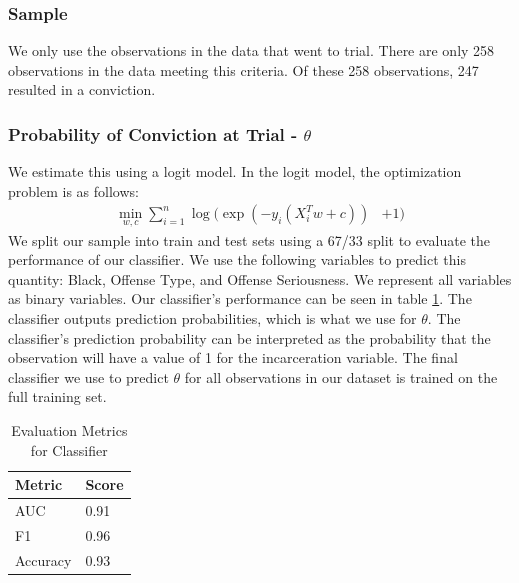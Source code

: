 \documentclass[11pt, oneside]{article}   	%
\theoremstyle{ModifiedStyle}
\begin{document}
		\subsubsection{Sample}
			We only use the observations in the data that went to trial. There are only 258 observations in the data meeting this criteria. Of these 258 observations, 247 resulted in a conviction.

	  \subsubsection{Probability of Conviction at Trial - $\theta$}
	    \label{theta-estimation}
	    We estimate this using a logit model. In the logit model, the optimization problem is as follows:
			\begin{align*}
				\min_{w,c} \sum_{i=1}^n \log(\exp(-y_i(X_i^Tw+c)) &+ 1)
			\end{align*}
			We split our sample into train and test sets using a 67/33 split to evaluate the performance of our classifier. We use the following variables to predict this quantity: Black, Offense Type, and Offense Seriousness. We represent all variables as binary variables.  Our classifier's performance can be seen in table \ref{classifier-performance}. The classifier outputs prediction probabilities, which is what we use for $\theta$. The classifier's prediction probability can be interpreted as the probability that the observation will have a value of 1 for the incarceration variable. The final classifier we use to predict $\theta$ for all observations in our dataset is trained on the full training set.

	    \begin{table}[H]
	      \centering
	      \caption{Evaluation Metrics for Classifier}
	      \label{classifier-performance}
	      \begin{tabular}{|l|l|}
	      \hline
	      \textbf{Metric} & \textbf{Score} \\ \hline
	      AUC             & 0.91           \\ \hline
	      F1              & 0.96           \\ \hline
	      Accuracy        & 0.93           \\ \hline
	      \end{tabular}
	    \end{table}
\end{document}
